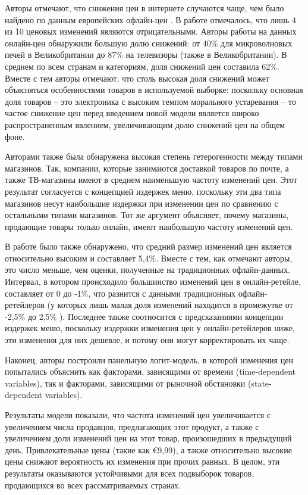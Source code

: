 Авторы отмечают, что снижения цен в интернете случаются чаще, чем было найдено по данным европейских офлайн-цен \cite{dhyne2005price}. В работе \cite{dhyne2005price} отмечалось, что лишь 4 из 10 ценовых изменений являются отрицательными. Авторы работы \cite{RePEc:ecb:ecbwps:2006645} на данных онлайн-цен обнаружили большую долю снижений: от 40\% для микроволновых печей в Великобритании до 87\% на телевизоры (также в Великобритании). В среднем по всем странам и категориям, доля снижений цен составила 62\%. Вместе с тем авторы отмечают, что столь высокая доля снижений может объясняться особенностями товаров в используемой выборке: поскольку основная доля товаров – это электроника с высоким темпом морального устаревания – то частое снижение цен перед введением новой модели является широко распространенным явлением, увеличивающим долю снижений цен на общем фоне.

Авторами также была обнаружена высокая степень гетерогенности между типами магазинов. Так, компании, которые занимаются доставкой товаров по почте, а также ТВ-магазины имеют в среднем наименьшую частоту изменений цен. Этот результат согласуется с концепцией издержек меню, поскольку эти два типа магазинов несут наибольшие издержки при изменении цен по сравнению с остальными типами магазинов. Тот же аргумент объясняет, почему магазины, продающие товары только онлайн, имеют наибольшую частоту изменений цен.

В работе было также обнаружено, что средний размер изменений цен является относительно высоким и составляет 5,4\%. Вместе с тем, как отмечают авторы, это число меньше, чем оценки, полученные на традиционных офлайн-данных. Интервал, в котором происходило большинство изменений цен в онлайн-ретейле, составляет от 0 до -1\%, что разнится с данными традиционных офлайн-ретейлеров (у которых лишь малая доля изменений находится в промежутке от -2,5\% до 2,5\% \cite{Hoffmann2006}). Последнее также соотносится с предсказаниями концепции издержек меню, поскольку издержки изменения цен у онлайн-ретейлеров ниже, эти изменения для них дешевле, и потому они могут корректировать их чаще.

Наконец, авторы построили панельную логит-модель, в которой изменения цен попытались объяснить как факторами, зависящими от времени (time-dependent variables), так и факторами, зависящими от рыночной обстановки (state-dependent variables). 

Результаты модели показали, что частота изменений цен увеличивается с увеличением числа продавцов, предлагающих этот продукт, а также с увеличением доли изменений цен на этот товар, произошедших в предыдущий день. Привлекательные цены (такие как €9,99), а также относительно высокие цены снижают вероятность их изменения при прочих равных. В целом, эти результаты оказываются устойчивыми для всех подвыборок товаров, продающихся во всех рассматриваемых странах.

